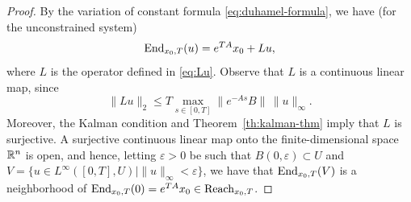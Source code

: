 \begin{proof}
    By the variation of constant formula \eqref{eq:duhamel-formula}, we have (for the unconstrained system)
    \begin{equation}
        \operatorname{End}_{x_0,T}(u) = e^{TA}x_0 + Lu,
    \end{equation}
    where $L$ is the operator defined in \eqref{eq:Lu}. 
    Observe that $L$ is a continuous linear map, since 
    \begin{equation}
        \|Lu\|_2 \le T \max_{s\in [0,T]} \|e^{-As}B\| \, \|u\|_\infty.
    \end{equation}
    Moreover, the Kalman condition and Theorem~\ref{th:kalman-thm} imply that $L$ is surjective. A surjective continuous linear map onto the finite-dimensional space $\mathbb{R}^n$ is open, and hence, letting $\varepsilon>0$ be such that $B(0,\varepsilon)\subset U$ and $V=\{u\in L^\infty([0,T],U)\mid \|u\|_\infty<\varepsilon\}$, we have that $\operatorname{End}_{x_0,T}(V)$ is a neighborhood of $\operatorname{End}_{x_0,T}(0)= e^{TA}x_0\in\operatorname{Reach}_{x_0,T}$.
\end{proof}



